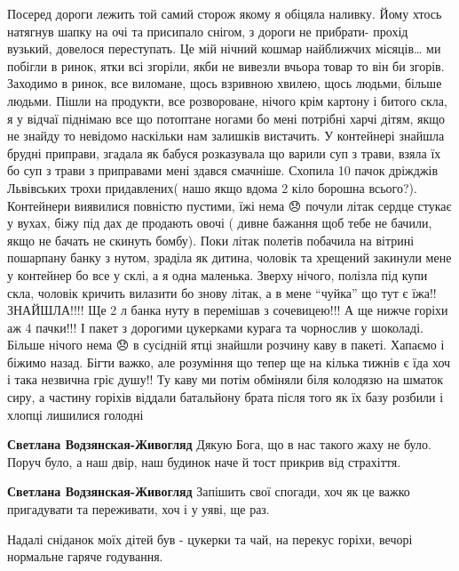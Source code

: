 Посеред дороги лежить той самий сторож якому я обіцяла наливку. Йому хтось
натягнув шапку на очі та присипало снігом, з дороги не прибрати- прохід
вузький, довелося переступать. Це мій нічний кошмар найближчих місяців… ми
побігли в ринок, ятки всі згоріли, якби не вивезли вчьора товар то він би
згорів. Заходимо в ринок, все виломане, щось взривною хвилею, щось людьми,
більше людьми. Пішли на продукти, все розвороване, нічого крім картону і битого
скла, я у відчаї піднімаю все що потоптане ногами бо мені потрібні харчі дітям,
якщо не знайду то невідомо наскільки нам залишків вистачить. У контейнері
знайшла брудні приправи, згадала як бабуся розказувала що варили суп з трави,
взяла їх бо суп з трави з приправами мені здався смачніше. Схопила 10 пачок
дріжджів Львівських трохи придавлених( нашо якщо вдома 2 кіло борошна всього?).
Контейнери виявилися повністю пустими, їжі нема 😞 почули літак сердце стукає у
вухах, біжу під дах де продають овочі ( дивне бажання щоб тебе не бачили, якщо
не бачать не скинуть бомбу). Поки літак полетів побачила на вітрині пошарпану
банку з нутом, зраділа як дитина, чоловік та хрещений закинули мене у контейнер
бо все у склі, а я одна маленька. Зверху нічого, полізла під купи скла, чоловік
кричить вилазити бо знову літак, а в мене \enquote{чуйка} що тут є їжа!! ЗНАЙШЛА!!!! Ще
2 л банка нуту в перемішав з сочевицею!!! А ще нижче горіхи аж 4 пачки!!! І
пакет з дорогими цукерками курага та чорнослив у шоколаді. Більше нічого нема
😞 в сусідній ятці знайшли розчину каву в пакеті. Хапаємо і біжимо назад. Бігти
важко, але розуміння що тепер ще на кілька тижнів є їда хоч і така незвична
гріє душу!! Ту каву ми потім обміняли біля колодязю на шматок сиру, а частину
горіхів віддали батальйону брата після того як їх базу розбили і хлопці
лишилися голодні

\begin{itemize} %
\textbf{Светлана Водзянская-Живогляд} Дякую Бога, що в нас такого жаху не було. Поруч було, а наш двір, наш будинок наче й тост прикрив від страхіття.

\textbf{Светлана Водзянская-Живогляд} Запішить свої спогади, хоч як це важко пригадувати та переживати, хоч і у уяві, ще раз.
\end{itemize} %


Надалі сніданок моїх дітей був - цукерки та чай, на перекус горіхи, вечорі нормальне гаряче годування.

